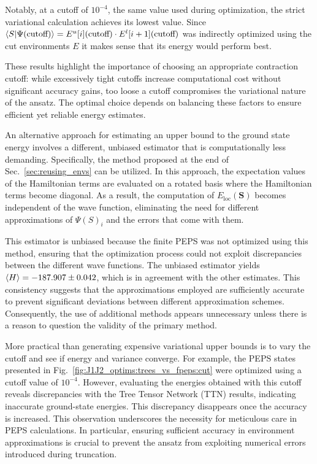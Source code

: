 \documentclass[aps,notitlepage,twocolumn,nofootinbib,superscriptaddress,pra,10pt]{revtex4-2}
\begin{document}
Notably, at a cutoff of $10^{-4}$, the same value used during optimization, the strict variational calculation achieves its lowest value. Since $\braket{S|\Psi(\text{cutoff})}=E^u[i]( \text{cutoff}) \cdot E^l[i+1](\text{cutoff})$ was indirectly optimized using the cut environments $E$ it makes sense that its energy would perform best.

These results highlight the importance of choosing an appropriate contraction cutoff: while excessively tight cutoffs increase computational cost without significant accuracy gains, too loose a cutoff compromises the variational nature of the ansatz. The optimal choice depends on balancing these factors to ensure efficient yet reliable energy estimates.

An alternative approach for estimating an upper bound to the ground state energy involves a different, unbiased estimator that is computationally less demanding. Specifically, the method proposed at the end of Sec.~\ref{sec:reusing_envs} can be utilized. In this approach, the expectation values of the Hamiltonian terms are evaluated on a rotated basis where the Hamiltonian terms become diagonal. As a result, the computation of $E_\text{loc}(\mathbf{S})$ becomes independent of the wave function, eliminating the need for different approximations of $\Psi(S)_i$ and the errors that come with them.

This estimator is unbiased because the finite PEPS was not optimized using this method, ensuring that the optimization process could not exploit discrepancies between the different wave functions. The unbiased estimator yields $\braket{H}=-187.907 \pm 0.042$, which is in agreement with the other estimates. This consistency suggests that the approximations employed are sufficiently accurate to prevent significant deviations between different approximation schemes. Consequently, the use of additional methods appears unnecessary unless there is a reason to question the validity of the primary method.

More practical than generating expensive variational upper bounds is to vary the cutoff and see if energy and variance converge. For example, the PEPS states presented in Fig.~\ref{fig:J1J2_optims:trees_vs_fpeps:cut} were optimized using a cutoff value of $10^{-4}$. However, evaluating the energies obtained with this cutoff reveals discrepancies with the Tree Tensor Network (TTN) results, indicating inaccurate ground-state energies. This discrepancy disappears once the accuracy is increased. This observation underscores the necessity for meticulous care in PEPS calculations. In particular, ensuring sufficient accuracy in environment approximations is crucial to prevent the ansatz from exploiting numerical errors introduced during truncation.
\end{document}
